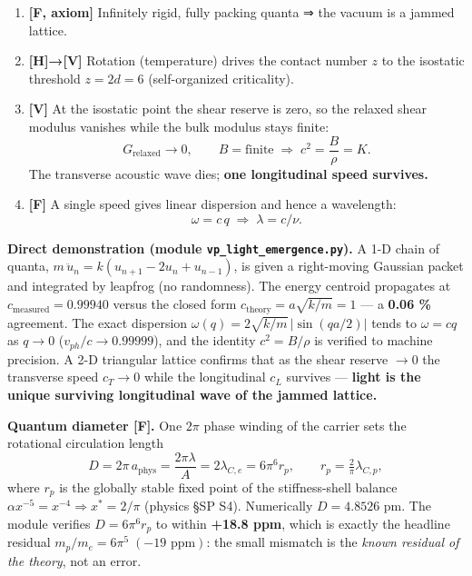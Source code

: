 \documentclass[
  10pt,
]{article}
\providecommand{\tightlist}{%
  \setlength{\itemsep}{0pt}\setlength{\parskip}{0pt}}
\begin{document}
\begin{enumerate}
\def\labelenumi{\arabic{enumi}.}
\tightlist
\item
  \textbf{{[}F, axiom{]}} Infinitely rigid, fully packing quanta ⇒ the
  vacuum is a jammed lattice.
\item
  \textbf{{[}H{]}→{[}V{]}} Rotation (temperature) drives the contact
  number \(z\) to the isostatic threshold \(z = 2d = 6\) (self-organized
  criticality).
\item
  \textbf{{[}V{]}} At the isostatic point the shear reserve is zero, so
  the relaxed shear modulus vanishes while the bulk modulus stays
  finite:
  \[ G_{\text{relaxed}} \to 0,\qquad B = \text{finite}\;\Rightarrow\; c^2 = \frac{B}{\rho}=K. \]
  The transverse acoustic wave dies; \textbf{one longitudinal speed
  survives.}
\item
  \textbf{{[}F{]}} A single speed gives linear dispersion and hence a
  wavelength: \[ \omega = c\,q \;\Rightarrow\; \lambda = c/\nu. \]
\end{enumerate}

\textbf{Direct demonstration (module \texttt{vp\_light\_emergence.py}).}
A 1-D chain of quanta, \(m\,\ddot u_n = k(u_{n+1}-2u_n+u_{n-1})\), is
given a right-moving Gaussian packet and integrated by leapfrog (no
randomness). The energy centroid propagates at
\(c_{\text{measured}} = 0.99940\) versus the closed form
\(c_{\text{theory}} = a\sqrt{k/m} = 1\) --- a \textbf{0.06 \%}
agreement. The exact dispersion \(\omega(q)=2\sqrt{k/m}\,|\sin(qa/2)|\)
tends to \(\omega = cq\) as \(q\to 0\) (\(v_{ph}/c \to 0.99999\)), and
the identity \(c^2=B/\rho\) is verified to machine precision. A 2-D
triangular lattice confirms that as the shear reserve \(\to 0\) the
transverse speed \(c_T \to 0\) while the longitudinal \(c_L\) survives
--- \textbf{light is the unique surviving longitudinal wave of the
jammed lattice.}

\textbf{Quantum diameter {[}F{]}.} One \(2\pi\) phase winding of the
carrier sets the rotational circulation length
\[ D = 2\pi\,a_{\text{phys}} = \frac{2\pi\lambda}{A} = 2\lambda_{C,e} = 6\pi^6 r_p, \qquad
   r_p = \tfrac{2}{\pi}\lambda_{C,p}, \] where \(r_p\) is the globally
stable fixed point of the stiffness-shell balance
\(\alpha x^{-5}=x^{-4}\Rightarrow x^*=2/\pi\) (physics §SP S4).
Numerically \(D = 4.8526\) pm. The module verifies \(D=6\pi^6 r_p\) to
within \textbf{+18.8 ppm}, which is exactly the headline residual
\(m_p/m_e = 6\pi^5\;(-19\text{ ppm})\): the small mismatch is the
\emph{known residual of the theory}, not an error.
\end{document}
